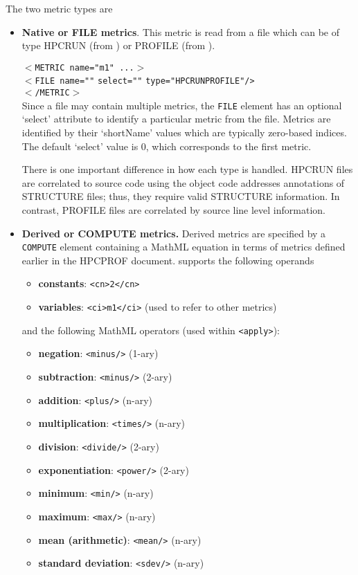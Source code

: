 \documentclass[english]{article}
\begin{document}
\begin{itemize}
The two metric types are
  \begin{itemize}
  \item \textbf{Native or FILE metrics}.  This metric is read from a file which can be of type HPCRUN (from ) or PROFILE (from ).

  \texttt{$<$METRIC name="m1" ...$>$}\\
  \texttt{$<$FILE name="}\texttt{"}
    \texttt{select="}\texttt{"}
    \texttt{type="}\texttt{HPCRUN\Bar PROFILE}\texttt{"/>}\\
  \texttt{$<$/METRIC$>$}\\

   Since a file may contain multiple metrics, the \texttt{FILE} element has an optional `select' attribute to identify a particular metric from the file.  Metrics are identified by their `shortName' values which are typically zero-based indices.  The default `select' value is 0, which corresponds to the first metric.

There is one important difference in how each type is handled.  HPCRUN files are correlated to source code using the object code addresses annotations of STRUCTURE files; thus, they require valid STRUCTURE information.  In contrast, PROFILE files are correlated by source line level information.

  \item \textbf{Derived or COMPUTE metrics.} Derived metrics are specified by a \texttt{COMPUTE} element containing a MathML equation in terms of metrics defined earlier in the HPCPROF document.   supports the following operands
  \begin{itemize}
    \item \textbf{constants}: \verb+<cn>2</cn>+
    \item \textbf{variables}: \verb+<ci>m1</ci>+ (used to refer to other metrics)
  \end{itemize}
and the following MathML operators (used within \verb+<apply>+):
  \begin{itemize}
    \item \textbf{negation}: \verb+<minus/>+ (1-ary)
    \item \textbf{subtraction}: \verb+<minus/>+ (2-ary)
    \item \textbf{addition}: \verb+<plus/>+ (n-ary)
    \item \textbf{multiplication}: \verb+<times/>+ (n-ary)
    \item \textbf{division}: \verb+<divide/>+ (2-ary)
    \item \textbf{exponentiation}: \verb+<power/>+ (2-ary)
    \item \textbf{minimum}: \verb+<min/>+ (n-ary)
    \item \textbf{maximum}: \verb+<max/>+ (n-ary)
    \item \textbf{mean (arithmetic)}: \verb+<mean/>+ (n-ary)
    \item \textbf{standard deviation}: \verb+<sdev/>+ (n-ary)
  \end{itemize}


\end{itemize}
\end{itemize}
\end{document}
